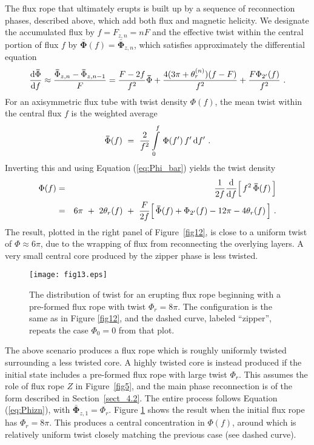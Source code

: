 \documentclass[10pt,namedreferneces]{SolarPhysics}
\begin{document}
\begin{article}
The flux rope that ultimately erupts is built up by a sequence of reconnection phases, described above, which add both flux and magnetic helicity.  We designate the accumulated flux by
$f=F_{z,n}=nF$ and the effective twist within the central portion of flux $f$ by $\bm\bar{\Phi}(f)=\bm\bar{\Phi}_{z,n}$, which satisfies approximately the differential equation
\begin{equation}
  {{\rm d}\bm\bar{\Phi}\over {\rm d}f} \approx{\bm\bar{\Phi}_{z,n}-\bm\bar{\Phi}_{z,n-1}\over F} = {F-2f\over f^2}\bm\bar{\Phi} + {4(3\pi+\theta_r^{(n)})(f-F)\over f^2} 
  + {F\Phi_{2'}(f)\over f^2} ~.
  	\label{eq:Phi_bar}
\end{equation}
For an axisymmetric flux tube with twist density $\Phi(f)$, the mean twist within the central flux $f$ is the weighted average \cite{priest16}
\begin{equation}
  \bm\bar{\Phi}(f) ~=~ {2\over f^2}\int\limits_0^f\, \Phi(f')\, f'\, {\rm d}f' ~.
\end{equation}
Inverting this and using Equation  (\ref{eq:Phi_bar}) yields the twist density
\begin{eqnarray}
  \Phi(f) &=& {1\over 2f}{{\rm d}\over {\rm d}f}\Bigl[ \, f^2\, \bm\bar{\Phi}(f) \, \Bigr] \nonumber \\
  &=& 6\pi ~+~2\theta_r(f)~+~ {F\over 2f}\Bigl[\, \bm\bar{\Phi}(f)+\Phi_{2'}(f) - 12\pi - 4\theta_r(f)\,\Bigr] ~.
  	\label{eq:phif}
\end{eqnarray}
The result, plotted in the right panel of Figure\ \ref{fig12}, is close to a uniform twist of $\Phi\approx 6\pi$, due to the wrapping of flux from reconnecting the overlying layers.  A very small central core produced by the zipper phase is less twisted.

\begin{figure}[h]
{\centering
 \texttt{[image: fig13.eps]}
\caption{The distribution of twist for an erupting flux rope beginning with a pre-formed flux rope with twist $\Phi_r=8\pi$.   The configuration is the same as in Figure \ref{fig12}, and the dashed curve, labeled ``zipper'', repeats the case $\Phi_0=0$ from that plot.}
\label{fig13}}
\end{figure}
The above scenario produces a flux rope which is roughly uniformly twisted surrounding a less twisted core.  A highly twisted core is instead produced if the initial state includes a pre-formed flux rope with large twist $\Phi_r$.  This assumes the role of flux rope $Z$ in Figure\ \ref{fig5}, and the main phase reconnection is of the form described in Section\ \ref{sect_4.2}.  The entire process  follows Equation  (\ref{eq:Phizn}), with $\bm\bar{\Phi}_{z,1}=\Phi_r$.  Figure \ref{fig13} shows the result when the initial flux rope has $\Phi_r=8\pi$.  This produces a central concentration in $\Phi(f)$, around which is relatively uniform twist closely matching  the previous case (see dashed curve).


\end{article}
\end{document}
